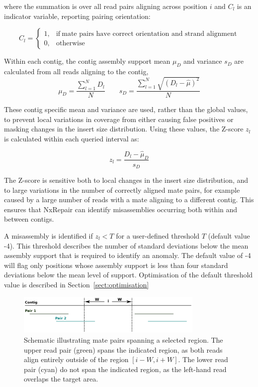 where the summation is over all read pairs aligning across position $i$ and $C_l$ is an indicator variable, reporting pairing orientation:

\begin{equation}
    C_l=
    \begin{cases}
      1, & \text{if}\ \text{mate pairs have correct orientation and strand alignment} \\
      0, & \text{otherwise}
    \end{cases}
  \label{eq:C}
  \end{equation}

Within each contig, the contig assembly support mean $\mu_D$ and variance $s_D$ are calculated from all reads aligning to the contig,
\begin{equation}
\mu_D = \frac{\sum_{l=1}^N D_l}{N} \qquad s_D = \frac{\sum_{l=1}^N \sqrt{(D_l - \hat{\mu})^2}}{N}
\label{eq:contigD}
\end{equation}

These contig specific mean and variance are used, rather than the global values, to prevent local variations in coverage from either causing false positives or masking changes in the insert size distribution. Using these values,  the Z-score $z_l$ is calculated within each queried interval as: 

\begin{equation}
z_l = \frac{D_l - \hat{\mu}_D}{s_D}
\label{eq:zscore}
\end{equation}

The Z-score is sensitive both to local changes in the insert size distribution, and to large variations in the number of correctly aligned mate pairs, for example caused by a large number of reads with a mate aligning to a different contig. This ensures that NxRepair can identify misassemblies occurring both within and between contigs.  

A misassembly is identified if $z_l < T$ for a user-defined threshold $T$ (default value -4). This threshold describes the number of standard deviations below the mean assembly support that is required to identify an anomaly. The default value of -4 will flag only positions whose assembly support is less than four standard deviations below the mean level of support. Optimisation of the default threshold value is described in Section~\ref{sect:optimisation}

\begin{figure}
\centerline{\includegraphics[width=0.8\textwidth]{illumina/spanning.pdf}}
\caption{Schematic illustrating mate pairs spanning a selected region. The upper read pair (green) spans the indicated region, as both reads align entirely outside of the region $[i-W, i+W]$. The lower read pair (cyan) do not span the indicated region, as the left-hand read overlaps the target area. \label{fig:spanning}}
\end{figure}

